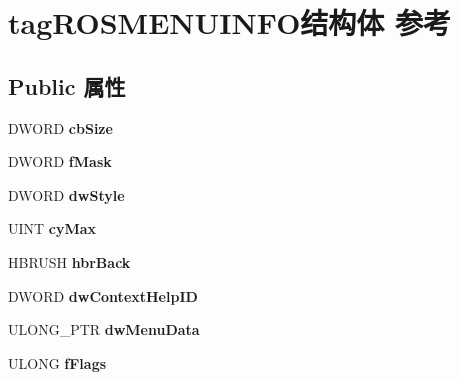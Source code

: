 \hypertarget{structtag_r_o_s_m_e_n_u_i_n_f_o}{}\section{tag\+R\+O\+S\+M\+E\+N\+U\+I\+N\+F\+O结构体 参考}
\label{structtag_r_o_s_m_e_n_u_i_n_f_o}
\subsection*{Public 属性}
\begin{DoxyCompactItemize}
\item 
\mbox{\label{structtag_r_o_s_m_e_n_u_i_n_f_o_ab37186eb379bc1798b1eef898daa7210}} 
D\+W\+O\+RD {\bfseries cb\+Size}
\item 
\mbox{\label{structtag_r_o_s_m_e_n_u_i_n_f_o_afe58c21243a88602e5f4b49f30be3c42}} 
D\+W\+O\+RD {\bfseries f\+Mask}
\item 
\mbox{\label{structtag_r_o_s_m_e_n_u_i_n_f_o_a4e12211cf281acecbe4e29dcd3aaaf6a}} 
D\+W\+O\+RD {\bfseries dw\+Style}
\item 
\mbox{\label{structtag_r_o_s_m_e_n_u_i_n_f_o_a53b85715ab3d9b1f8b266a9ac17a1d8f}} 
U\+I\+NT {\bfseries cy\+Max}
\item 
\mbox{\label{structtag_r_o_s_m_e_n_u_i_n_f_o_a3583030d98841a18174d2631a7dfedab}} 
H\+B\+R\+U\+SH {\bfseries hbr\+Back}
\item 
\mbox{\label{structtag_r_o_s_m_e_n_u_i_n_f_o_a35132ab39fb15d5443e9334a96b8da53}} 
D\+W\+O\+RD {\bfseries dw\+Context\+Help\+ID}
\item 
\mbox{\label{structtag_r_o_s_m_e_n_u_i_n_f_o_a699e7aa571e4d8a92d820ab7fc4d6e03}} 
U\+L\+O\+N\+G\+\_\+\+P\+TR {\bfseries dw\+Menu\+Data}
\item 
\mbox{\label{structtag_r_o_s_m_e_n_u_i_n_f_o_a70ce4479ceaae88cc3c6cacdb414ee18}} 
U\+L\+O\+NG {\bfseries f\+Flags}
\item 

\end{DoxyCompactItemize}
